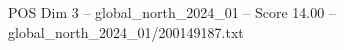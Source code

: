 \begin{textsample}{POS Dim 3 – global\_north\_2024\_01 – Score 14.00 – global\_north\_2024\_01/200149187.txt}
\end{textsample}
